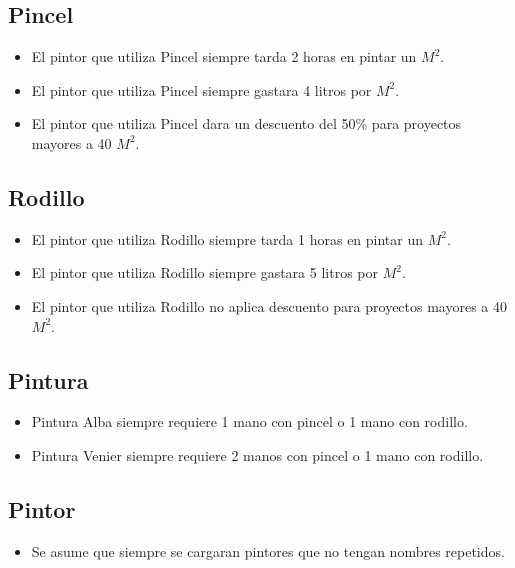 \documentclass[titlepage,a4paper]{article}
\begin{document}
  \subsection{Pincel}
    \begin{itemize}
      \item El pintor que utiliza Pincel siempre tarda 2 horas en pintar un $M^2$.
      \item El pintor que utiliza Pincel siempre gastara 4 litros por $M^2$.
      \item El pintor que utiliza Pincel dara un descuento del 50\% para proyectos mayores a 40 $M^2$.
    \end{itemize}

  \subsection{Rodillo}
    \begin{itemize}
      \item El pintor que utiliza Rodillo siempre tarda 1 horas en pintar un $M^2$.
      \item El pintor que utiliza Rodillo siempre gastara 5 litros por $M^2$.
      \item El pintor que utiliza Rodillo no aplica descuento para proyectos mayores a 40 $M^2$.
    \end{itemize}

  \subsection{Pintura}
    \begin{itemize}
      \item Pintura Alba siempre requiere 1 mano con pincel o 1 mano con rodillo.
      \item Pintura Venier siempre requiere 2 manos con pincel o 1 mano con rodillo.
    \end{itemize}

  \subsection{Pintor}
    \begin{itemize}
      \item Se asume que siempre se cargaran pintores que no tengan nombres repetidos.
    \end{itemize}
  

\newpage
\end{document}

